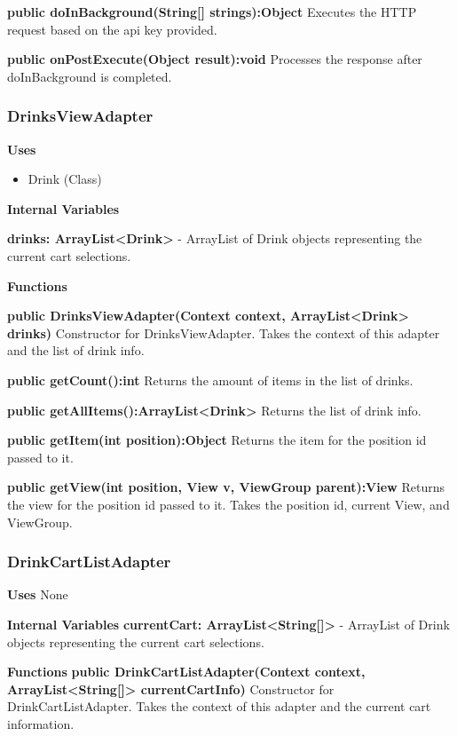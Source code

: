 \documentclass [10pt]{article}
\begin{document}
\textbf{public doInBackground(String[] strings):Object}
Executes the HTTP request based on the api key provided.

\textbf{public onPostExecute(Object result):void}
Processes the response after doInBackground is completed.

\subsubsection{DrinksViewAdapter}

\textbf{Uses}

\begin{itemize}
	\item Drink (Class)
\end{itemize}

\textbf{Internal Variables}

\textbf{drinks: ArrayList<Drink>} - ArrayList of Drink objects representing the current cart selections.

\textbf{Functions}

\textbf{public DrinksViewAdapter(Context context, ArrayList<Drink> drinks)}
Constructor for DrinksViewAdapter. Takes the context of this adapter and the list of drink info.

\textbf{public getCount():int}
Returns the amount of items in the list of drinks.

\textbf{public getAllItems():ArrayList<Drink>}
Returns the list of drink info.

\textbf{public getItem(int position):Object}
Returns the item for the position id passed to it.

\textbf{public getView(int position, View v, ViewGroup parent):View}
Returns the view for the position id passed to it. Takes the position id, current View, and ViewGroup.

\subsubsection{DrinkCartListAdapter}

\textbf{Uses} None

\textbf{Internal Variables}
\textbf{currentCart: ArrayList<String[]>} - ArrayList of Drink objects representing the current cart selections.

\textbf{Functions}
\textbf{public DrinkCartListAdapter(Context context, ArrayList<String[]> currentCartInfo)}
Constructor for DrinkCartListAdapter. Takes the context of this adapter and the current cart information.
\end{document}
